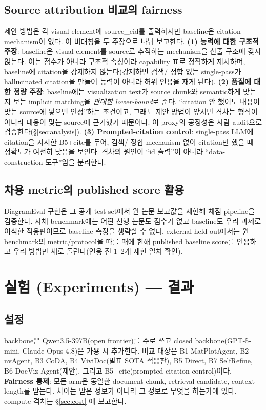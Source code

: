 \documentclass[11pt]{article}
\begin{document}
\subsection{Source attribution 비교의 fairness}
\label{sec:fairness}

제안 방법은 각 visual element에 source\_eid를 출력하지만 baseline은 citation mechanism이 없다.
이 비대칭을 두 주장으로 나눠 보고한다. \textbf{(1) 능력에 대한 구조적 주장}: baseline은 visual
element를 source로 추적하는 mechanism을 산출 구조에 갖지 않는다. 이는 점수가 아니라 구조적
속성이라 capability 표로 정직하게 제시하며, baseline에 citation을 강제하지 않는다(강제하면 검색/
정합 없는 single-pass가 hallucinated citation을 만들어 능력이 아니라 허위 인용을 재게 된다).
\textbf{(2) 품질에 대한 정량 주장}: baseline에는 visualization text가 source chunk와 semantic하게
맞는지 보는 implicit matching을 \emph{관대한 lower-bound}로 준다. ``citation 안 했어도 내용이 맞는
source에 닿으면 인정''하는 조건이고, 그래도 제안 방법이 앞서면 격차는 형식이 아니라 내용이 맞는
source에 근거했기 때문이다. 이 proxy의 공정성은 사람 audit으로 검증한다(\S\ref{sec:analysis}).
\textbf{(3) Prompted-citation control}: single-pass LLM에 citation을 지시한 B5+cite를 두어, 검색/
정합 mechanism 없이 citation만 했을 때 정확도가 여전히 낮음을 보인다. 격차의 원인이 ``id 출력''이
아니라 ``data-construction 도구''임을 분리한다.

\subsection{차용 metric의 published score 활용}
DiagramEval 구현은 그 공개 test set에서 원 논문 보고값을 재현해 채점 pipeline을 검증한다. 자체
benchmark에는 어떤 선행 논문도 점수가 없고 baseline도 우리 과제로 이식한 적응판이므로 baseline
측정을 생략할 수 없다. external held-out에서는 원 benchmark의 metric/protocol을 따를 때에 한해
published baseline score를 인용하고 우리 방법만 새로 돌린다(인용 전 1--2개 재현 일치 확인).

\section{실험 (Experiments) — 결과}
\label{sec:results}

\subsection{설정}
backbone은 Qwen3.5-397B(open frontier)를 주로 쓰고 closed backbone(GPT-5-mini, Claude Opus 4.8)은
가용 시 추가한다. 비교 대상은 B1 MatPlotAgent, B2 nvAgent, B3 CoDA, B4 ViviDoc(발표 SOTA 적응판),
B5 Direct, B7 SelfRefine, B6 DocViz-Agent(제안), 그리고 B5+cite(prompted-citation control)이다.
\textbf{Fairness 통제}: 모든 arm은 동일한 document chunk, retrieval candidate, context length를
받는다. 차이는 받은 정보가 아니라 그 정보로 무엇을 하는가에 있다. compute 격차는 \S\ref{sec:cost}
에 보고한다.
\end{document}
